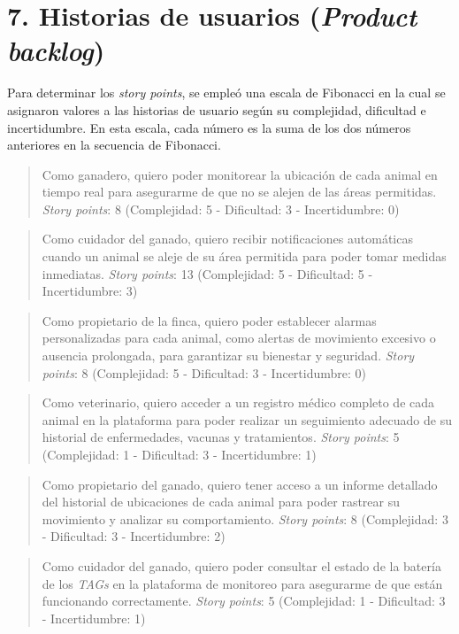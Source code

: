 \documentclass[
11pt, %
]{charter}
\begin{document}
\section{7. Historias de usuarios (\textit{Product backlog})}
\label{sec:backlog}

Para determinar los \emph{story points}, se empleó una escala de Fibonacci en la cual se asignaron valores a las historias de usuario según su complejidad, dificultad e incertidumbre. En esta escala, cada número es la suma de los dos números anteriores en la secuencia de Fibonacci.

\begin{quote}
Como ganadero, quiero poder monitorear la ubicación de cada animal en tiempo real para asegurarme de que no se alejen de las áreas permitidas. \emph{Story points}: 8 (Complejidad: 5 - Dificultad: 3 - Incertidumbre: 0)
\end{quote} 

\begin{quote}
Como cuidador del ganado, quiero recibir notificaciones automáticas cuando un animal se aleje de su área permitida para poder tomar medidas inmediatas. \emph{Story points}: 13 (Complejidad: 5 - Dificultad: 5 - Incertidumbre: 3)
\end{quote} 

\begin{quote}
Como propietario de la finca, quiero poder establecer alarmas personalizadas para cada animal, como alertas de movimiento excesivo o ausencia prolongada, para garantizar su bienestar y seguridad. \emph{Story points}: 8 (Complejidad: 5 - Dificultad: 3 - Incertidumbre: 0)
\end{quote} 

\begin{quote}
Como veterinario, quiero acceder a un registro médico completo de cada animal en la plataforma para poder realizar un seguimiento adecuado de su historial de enfermedades, vacunas y tratamientos. \emph{Story points}: 5 (Complejidad: 1 - Dificultad: 3 - Incertidumbre: 1)
\end{quote} 

\begin{quote}
Como propietario del ganado, quiero tener acceso a un informe detallado del historial de ubicaciones de cada animal para poder rastrear su movimiento y analizar su comportamiento. \emph{Story points}: 8 (Complejidad: 3 - Dificultad: 3 - Incertidumbre: 2)
\end{quote} 

\begin{quote}
Como cuidador del ganado, quiero poder consultar el estado de la batería de los \emph{TAGs} en la plataforma de monitoreo para asegurarme de que están funcionando correctamente. \emph{Story points}: 5 (Complejidad: 1 - Dificultad: 3 - Incertidumbre: 1)
\end{quote}
\end{document}
